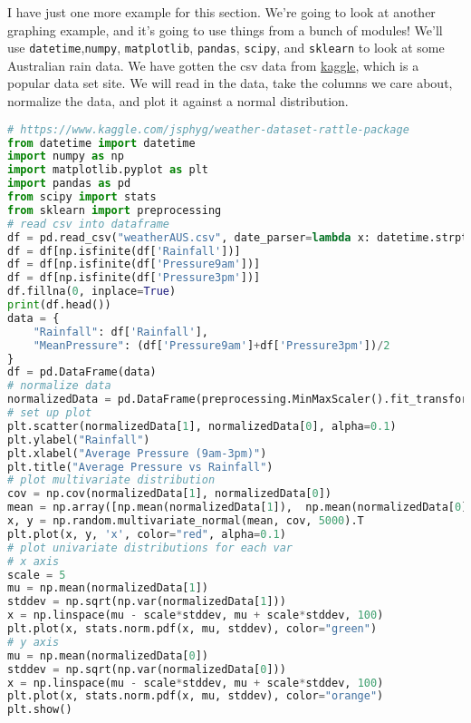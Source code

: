 \documentclass[12pt, twoside, reqno]{book}
\begin{document}
I have just one more example for this section. We're going to look at another graphing example, and it's going to use things from a bunch of modules! We'll use \texttt{datetime},\texttt{numpy}, \texttt{matplotlib}, \texttt{pandas}, \texttt{scipy}, and \texttt{sklearn} to look at some Australian rain data. We have gotten the csv data from \href{https://www.kaggle.com/jsphyg/weather-dataset-rattle-package}{kaggle}, which is a popular data set site. We will read in the data, take the columns we care about, normalize the data, and plot it against a normal distribution.
\begin{lstlisting}[language=Python]
# https://www.kaggle.com/jsphyg/weather-dataset-rattle-package
from datetime import datetime
import numpy as np
import matplotlib.pyplot as plt
import pandas as pd
from scipy import stats
from sklearn import preprocessing
# read csv into dataframe
df = pd.read_csv("weatherAUS.csv", date_parser=lambda x: datetime.strptime(x, "%Y-%m-%d"))
df = df[np.isfinite(df['Rainfall'])]
df = df[np.isfinite(df['Pressure9am'])]
df = df[np.isfinite(df['Pressure3pm'])]
df.fillna(0, inplace=True)
print(df.head())
data = {
    "Rainfall": df['Rainfall'], 
    "MeanPressure": (df['Pressure9am']+df['Pressure3pm'])/2
}
df = pd.DataFrame(data)
# normalize data
normalizedData = pd.DataFrame(preprocessing.MinMaxScaler().fit_transform(df))
# set up plot
plt.scatter(normalizedData[1], normalizedData[0], alpha=0.1)
plt.ylabel("Rainfall")
plt.xlabel("Average Pressure (9am-3pm)")
plt.title("Average Pressure vs Rainfall")
# plot multivariate distribution
cov = np.cov(normalizedData[1], normalizedData[0])
mean = np.array([np.mean(normalizedData[1]),  np.mean(normalizedData[0])])
x, y = np.random.multivariate_normal(mean, cov, 5000).T
plt.plot(x, y, 'x', color="red", alpha=0.1)
# plot univariate distributions for each var
# x axis
scale = 5
mu = np.mean(normalizedData[1])
stddev = np.sqrt(np.var(normalizedData[1]))
x = np.linspace(mu - scale*stddev, mu + scale*stddev, 100)
plt.plot(x, stats.norm.pdf(x, mu, stddev), color="green")
# y axis
mu = np.mean(normalizedData[0])
stddev = np.sqrt(np.var(normalizedData[0]))
x = np.linspace(mu - scale*stddev, mu + scale*stddev, 100)
plt.plot(x, stats.norm.pdf(x, mu, stddev), color="orange")
plt.show()
\end{lstlisting}
\end{document}
